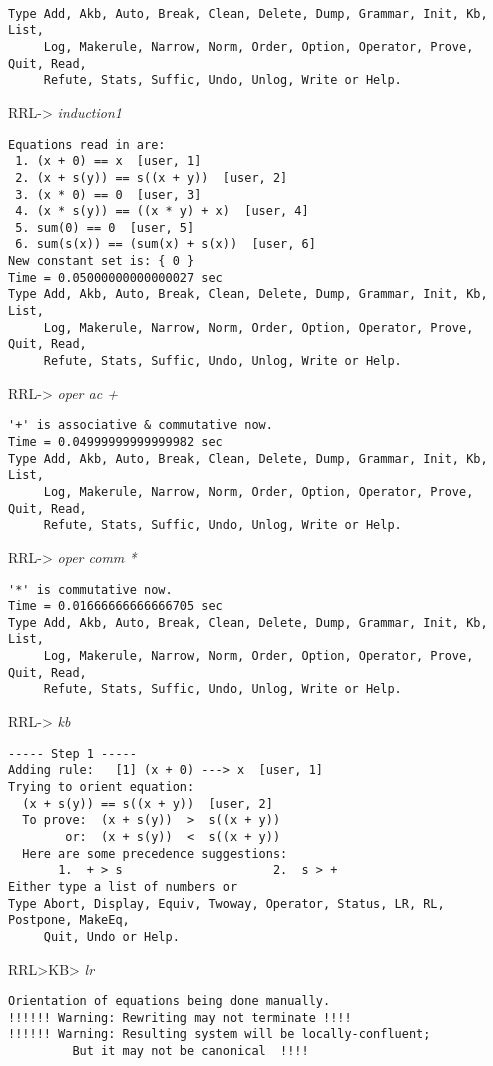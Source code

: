 \small
\tt
\begin{verbatim}
Type Add, Akb, Auto, Break, Clean, Delete, Dump, Grammar, Init, Kb, List,
     Log, Makerule, Narrow, Norm, Order, Option, Operator, Prove, Quit, Read,
     Refute, Stats, Suffic, Undo, Unlog, Write or Help.
\end{verbatim}
RRL-> {\em induction1}
\begin{verbatim}
Equations read in are:
 1. (x + 0) == x  [user, 1]
 2. (x + s(y)) == s((x + y))  [user, 2]
 3. (x * 0) == 0  [user, 3]
 4. (x * s(y)) == ((x * y) + x)  [user, 4]
 5. sum(0) == 0  [user, 5]
 6. sum(s(x)) == (sum(x) + s(x))  [user, 6]
New constant set is: { 0 }
Time = 0.05000000000000027 sec
Type Add, Akb, Auto, Break, Clean, Delete, Dump, Grammar, Init, Kb, List,
     Log, Makerule, Narrow, Norm, Order, Option, Operator, Prove, Quit, Read,
     Refute, Stats, Suffic, Undo, Unlog, Write or Help.
\end{verbatim}
RRL-> {\em oper ac +}
\begin{verbatim}
'+' is associative & commutative now.
Time = 0.04999999999999982 sec
Type Add, Akb, Auto, Break, Clean, Delete, Dump, Grammar, Init, Kb, List,
     Log, Makerule, Narrow, Norm, Order, Option, Operator, Prove, Quit, Read,
     Refute, Stats, Suffic, Undo, Unlog, Write or Help.
\end{verbatim}
RRL-> {\em oper comm *}
\begin{verbatim}
'*' is commutative now.
Time = 0.01666666666666705 sec
Type Add, Akb, Auto, Break, Clean, Delete, Dump, Grammar, Init, Kb, List,
     Log, Makerule, Narrow, Norm, Order, Option, Operator, Prove, Quit, Read,
     Refute, Stats, Suffic, Undo, Unlog, Write or Help.
\end{verbatim}
RRL-> {\em kb}
\begin{verbatim}
----- Step 1 -----
Adding rule:   [1] (x + 0) ---> x  [user, 1]
Trying to orient equation: 
  (x + s(y)) == s((x + y))  [user, 2]
  To prove:  (x + s(y))  >  s((x + y))
        or:  (x + s(y))  <  s((x + y))
  Here are some precedence suggestions:
       1.  + > s                     2.  s > +
Either type a list of numbers or
Type Abort, Display, Equiv, Twoway, Operator, Status, LR, RL, Postpone, MakeEq,
     Quit, Undo or Help.
\end{verbatim}
RRL>KB> {\em lr}
\begin{verbatim}
Orientation of equations being done manually.
!!!!!! Warning: Rewriting may not terminate !!!!
!!!!!! Warning: Resulting system will be locally-confluent;
         But it may not be canonical  !!!!
\end{verbatim}
